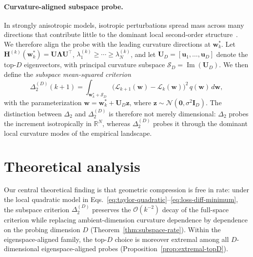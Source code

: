\documentclass{article}
\begin{document}
\paragraph{Curvature-aligned subspace probe.}
In strongly anisotropic models, isotropic perturbations spread mass across many directions that contribute little to the dominant local second-order structure~\citep{sagun2017hessian,ghorbani2019investigation,papyan2019fullspectrum,gurari2018tiny}. We therefore align the probe with the leading curvature directions at $\mathbf w_k^*$. Let $\mathbf H^{(k)}(\mathbf w_k^*) = \mathbf U \mathbf \Lambda \mathbf U^\top$, $\lambda_1^{(k)} \ge \cdots \ge \lambda_N^{(k)}$, and let $\mathbf U_D=[\mathbf u_1,\dots,\mathbf u_D]$ denote the top-$D$ eigenvectors, with principal curvature subspace $\mathcal S_D=\operatorname{Im}(\mathbf U_D)$. We then define the \emph{subspace mean-squared criterion}
\begin{equation}
\label{eq:delta2-subspace-method}
\Delta_2^{(D)}(k+1)
=
\int_{\mathbf w_k^*+\mathcal S_D}
\bigl(
\mathcal L_{k+1}(\mathbf w)-\mathcal L_k(\mathbf w)
\bigr)^2
\, q(\mathbf w)\, d\mathbf w,
\end{equation}
with the parameterization $\mathbf w=\mathbf w_k^*+\mathbf U_D\mathbf z$, where $\mathbf z\sim\mathcal N(\mathbf 0,\sigma^2\mathbf I_D)$. The distinction between $\Delta_2$ and $\Delta_2^{(D)}$ is therefore not merely dimensional: $\Delta_2$ probes the increment isotropically in $\mathbb R^N$, whereas $\Delta_2^{(D)}$ probes it through the dominant local curvature modes of the empirical landscape.

\section{Theoretical analysis}
\label{sec:theory}

Our central theoretical finding is that geometric compression is free in rate: under the local quadratic model in Eqs.~\eqref{eq:taylor-quadratic}--\eqref{eq:loss-diff-minimum}, the subspace criterion $\Delta_2^{(D)}$ preserves the $\mathcal O(k^{-2})$ decay of the full-space criterion while replacing ambient-dimension curvature dependence by dependence on the probing dimension $D$ (Theorem~\ref{thm:subspace-rate}). Within the eigenspace-aligned family, the top-$D$ choice is moreover extremal among all $D$-dimensional eigenspace-aligned probes (Proposition~\ref{prop:extremal-topD}).
\end{document}
